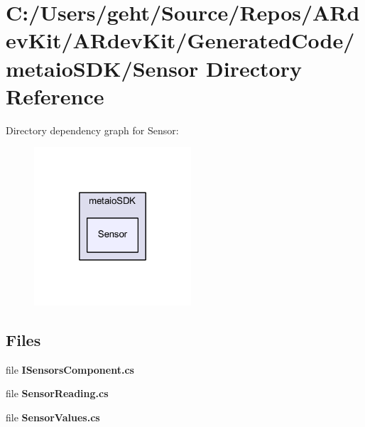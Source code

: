 \section{C\-:/\-Users/geht/\-Source/\-Repos/\-A\-Rdev\-Kit/\-A\-Rdev\-Kit/\-Generated\-Code/metaio\-S\-D\-K/\-Sensor Directory Reference}
\label{dir_f01bb70a4dc2d3083043d710cca93635}
Directory dependency graph for Sensor\-:
\nopagebreak
\begin{figure}[H]
\begin{center}
\leavevmode
\includegraphics[width=166pt]{dir_f01bb70a4dc2d3083043d710cca93635_dep}
\end{center}
\end{figure}
\subsection*{Files}
\begin{DoxyCompactItemize}
\item 
file {\bfseries I\-Sensors\-Component.\-cs}
\item 
file {\bfseries Sensor\-Reading.\-cs}
\item 
file {\bfseries Sensor\-Values.\-cs}
\end{DoxyCompactItemize}
